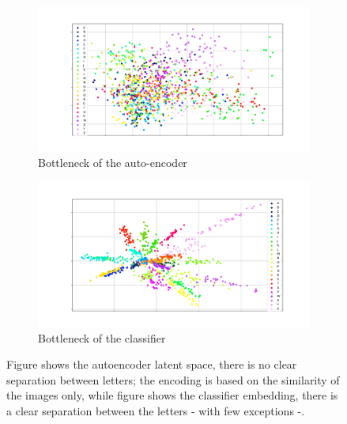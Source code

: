 \begin{figure}
    \centering
    \begin{subfigure}[b]{0.6\textwidth}
        \includegraphics[width=\textwidth]{images/gbem/auto_Vis_pca.png}
        \caption{Bottleneck of the auto-encoder}
        \label{subfig:autoenc_latent}
    \end{subfigure}
    \quad
    \begin{subfigure}[b]{0.6\textwidth}
        \includegraphics[width=\textwidth]{images/gbem/class_Vis_pca.png}
        \caption{Bottleneck of the classifier}
        \label{subfig:classifier_latent}
    \end{subfigure}
    \caption{Figure  shows the autoencoder latent space, there is no clear separation between letters; the encoding is based on the similarity of the images only, while figure  shows the classifier embedding, there is a clear separation between the letters - with few exceptions -.}

\end{figure}

